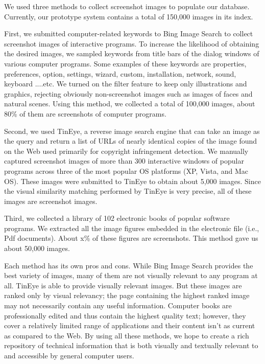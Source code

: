 \documentclass{www2010-submission}
\begin{document}

We used three methods to collect screenshot images to populate our
database. Currently, our prototype system contains a total of
150,000 images in its index.

First, we submitted computer-related keywords to Bing Image Search
to collect screenshot images of interactive programs. To increase
the likelihood of obtaining the desired images, we sampled
keywords from title bars of the dialog windows of various computer
programs. Some examples of these keywords are properties,
preferences, option, settings, wizard, custom, installation,
network, sound, keyboard ....etc. We turned on the filter feature
to keep only illustrations and graphics, rejecting obviously
non-screenshot images such as images of faces and natural scenes.
Using this method, we collected a total of 100,000 images, about
80\% of them are screenshots of computer programs.

Second, we used TinEye, a reverse image search engine that can
take an image as the query and return a list of URLs of nearly
identical copies of the image found on the Web used primarily for copyright
infringement detection. We manually captured screenshot images of more than
300 interactive windows of popular programs across three of the
most popular OS platforms (XP, Vista, and Mac OS). These images
were submitted to TinEye to obtain about 5,000 images. Since the
visual similarity matching performed by TinEye is very precise,
all of these images are screenshot images.

Third, we collected a library of 102 electronic books of popular
software programs. We extracted all the image figures embedded in
the electronic file (i.e., Pdf documents). About x\% of these
figures are screenshots. This method gave us about 50,000 images.

Each method has its own pros and cons. While Bing Image Search
provides the best variety of images, many of them are not visually
relevant to any program at all. TinEye is able to provide visually
relevant images. But these images are ranked only by visual
relevancy; the page containing the highest ranked image may not
necessarily contain any useful information. Computer books are
professionally edited and thus contain the highest quality
text; however, they cover a relatively limited range of applications
and their content isn't as current as compared to the Web. By
using all these methods, we hope to create a rich repository of
technical information that is both visually and textually relevant
to and accessible by general computer users.
 
\end{document}
